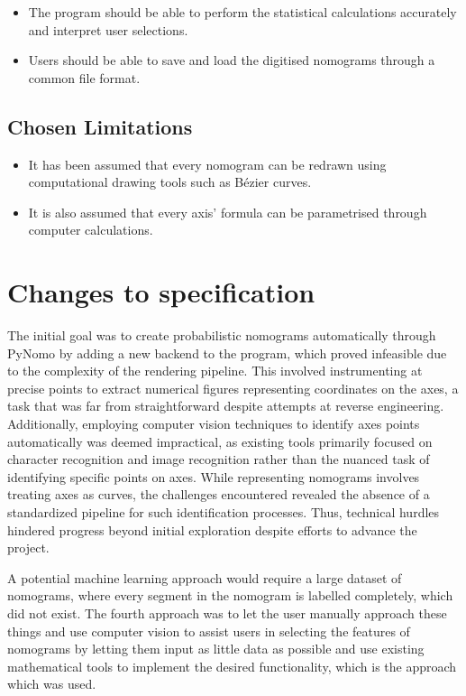 \documentclass{l4proj}
\begin{document}
\begin{itemize}
    \item The program should be able to perform the statistical calculations accurately and interpret user selections.
    \item Users should be able to save and load the digitised nomograms through a common file format. 
\end{itemize}
\subsection{Chosen Limitations}
\begin{itemize}
    \item It has been assumed that every nomogram can be redrawn using computational drawing tools such as Bézier curves.
    \item It is also assumed that every axis' formula can be parametrised through computer calculations. 
\end{itemize}
\section{Changes to specification}\label{spec-problems}

The initial goal was to create probabilistic nomograms automatically through PyNomo by adding a new backend to the program, which proved infeasible due to the complexity of the rendering pipeline. This involved instrumenting at precise points to extract numerical figures representing coordinates on the axes, a task that was far from straightforward despite attempts at reverse engineering. Additionally, employing computer vision techniques to identify axes points automatically was deemed impractical, as existing tools primarily focused on character recognition and image recognition rather than the nuanced task of identifying specific points on axes. While representing nomograms involves treating axes as curves, the challenges encountered revealed the absence of a standardized pipeline for such identification processes. Thus, technical hurdles hindered progress beyond initial exploration despite efforts to advance the project. 

A potential machine learning approach would require a large dataset of nomograms, where every segment in the nomogram is labelled completely, which did not exist. The fourth approach was to let the user manually approach these things and use computer vision to assist users in selecting the features of nomograms by letting them input as little data as possible and use existing mathematical tools to implement the desired functionality, which is the approach which was used. 
\end{document}

